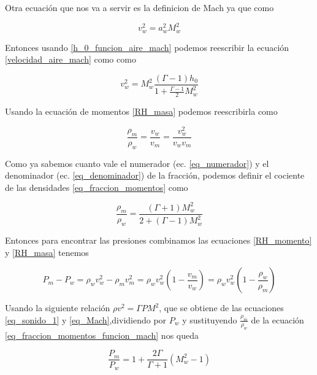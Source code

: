 \documentclass[12pt,a4paper]{book}
\begin{document}
Otra ecuación que nos va a servir es la definicion de Mach ya que como

\begin{equation}\label{velocidad_aire_mach}
  v_w^2 = a_w^2 M_w^2
\end{equation}

Entonces usando \ref{h_0_funcion_aire_mach} podemos reescribir la ecuación \ref{velocidad_aire_mach} como
como

\begin{equation} \label{eq_numerador}
  v_w^2 = M_w^2 \frac{\left( \Gamma -1 \right) h_0}{1+\frac{\Gamma - 1}{2} M_w^2}
\end{equation}

Usando la ecuación de momentos \ref{RH_masa} podemos reescribirla como

\begin{equation} \label{eq_fraccion_momentos}
  \frac{\rho_m }{\rho_w} = \frac{ v_w}{v_m} = \frac{v_w^2}{v_w v_m}
\end{equation}

Como ya sabemos cuanto vale el numerador (ec. \ref{eq_numerador}) y el denominador (ec. \ref{eq_denominador})
de la fracción, podemos definir el cociente de las densidades \ref{eq_fraccion_momentos} como 

\begin{equation}\label{eq_fraccion_momentos_funcion_mach}
  \frac{\rho_m}{\rho_w} = \frac{\left( \Gamma +1 \right) M_w^2}{2+ \left( \Gamma -1 \right) M_w^2}
\end{equation}

Entonces para encontrar las presiones combinamos las ecuaciones \ref{RH_momento} y \ref{RH_masa} tenemos

\begin{equation}
  P_m - P_w = \rho_w v_w^2 - \rho_m v_m^2 = \rho_w v_w^2 \left( 1 - \frac{v_m}{v_w}\right) = \rho_w v_w^2 \left( 1 - \frac{\rho_w}{\rho_m}\right)
\end{equation}

Usando la siguiente relación $\rho v^2 = \Gamma P M^2$, que se obtiene de las ecuaciones \ref{eq_sonido_1} y
\ref{eq_Mach},dividiendo por $P_w$ y sustituyendo  $\frac{\rho_m}{\rho_w}$ de la ecuación \ref{eq_fraccion_momentos_funcion_mach}
nos queda

\begin{equation} \label{eq_fraccion_Presiones}
  \frac{P_m}{P_w} = 1 + \frac{2 \Gamma}{\Gamma + 1} \left( M_w^2 -1\right)
\end{equation}
\end{document}
